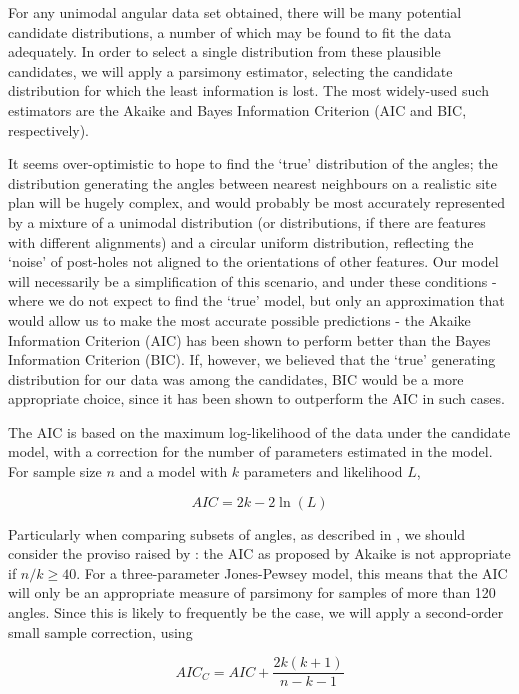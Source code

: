 \documentclass[../../ArchStats.tex]{subfiles}
\begin{document}
For any unimodal angular data set obtained, there will be many potential candidate distributions, a number of which may be found to fit the data adequately. In order to select a single distribution from these plausible candidates, we will apply a parsimony estimator, selecting the candidate distribution for which the least information is lost. The most widely-used such estimators are the Akaike and Bayes Information Criterion (AIC and BIC, respectively).

It seems over-optimistic to hope to find the `true' distribution of the angles; the distribution generating the angles between nearest neighbours on a realistic site plan will be hugely complex, and would probably be most accurately represented by a mixture of a unimodal distribution (or distributions, if there are features with different alignments) and a circular uniform distribution, reflecting the `noise'  of post-holes not aligned to the orientations of other features. Our model will necessarily be a simplification of this scenario, and under these conditions - where we do not expect to find the `true' model, but only an approximation that would allow us to make the most accurate possible predictions - the Akaike Information Criterion (AIC) has been shown to perform better than the Bayes Information Criterion (BIC)\cite{aho2014}. If, however, we believed that the `true' generating distribution for our data was among the candidates, BIC would be a more appropriate choice, since it has been shown to outperform the AIC in such cases. 

The AIC is based on the maximum log-likelihood of the data under the candidate model, with a correction for the number of parameters estimated in the model\cite{Akaike1974}. For sample size $n$ and a model with $k$ parameters and likelihood $L$, 

\[AIC = 2k - 2 \ln (L)\]

Particularly when comparing subsets of angles, as described in , we should consider the proviso raised by \cite{Burnham2004}: the AIC as proposed by Akaike  is not appropriate if $n/k \geq 40$. For a three-parameter Jones-Pewsey model, this means that the AIC will only be an appropriate measure of parsimony for samples of more than 120 angles. Since this is likely to frequently be the case, we will apply a second-order small sample correction, using

\[AIC_C = AIC + \frac{2k(k+1)}{n-k-1} \]
\end{document}
